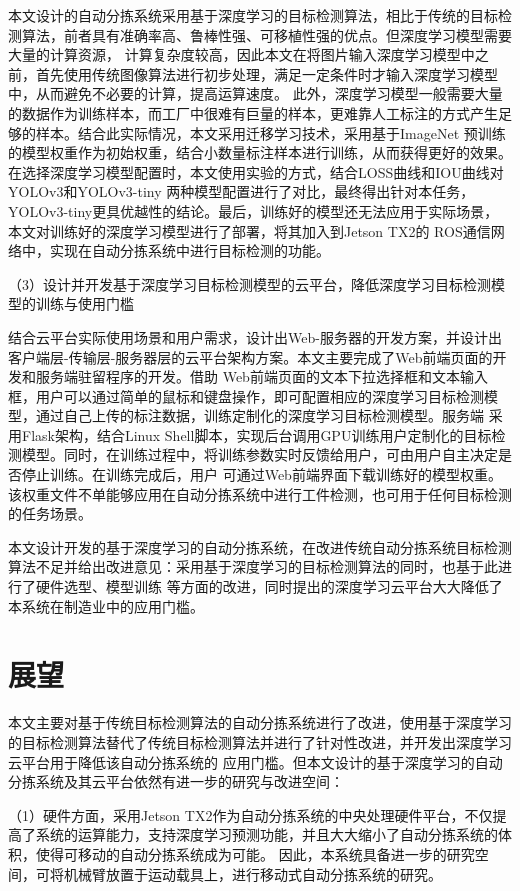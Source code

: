 本文设计的自动分拣系统采用基于深度学习的目标检测算法，相比于传统的目标检测算法，前者具有准确率高、鲁棒性强、可移植性强的优点。但深度学习模型需要大量的计算资源，
计算复杂度较高，因此本文在将图片输入深度学习模型中之前，首先使用传统图像算法进行初步处理，满足一定条件时才输入深度学习模型中，从而避免不必要的计算，提高运算速度。
此外，深度学习模型一般需要大量的数据作为训练样本，而工厂中很难有巨量的样本，更难靠人工标注的方式产生足够的样本。结合此实际情况，本文采用迁移学习技术，采用基于ImageNet
预训练的模型权重作为初始权重，结合小数量标注样本进行训练，从而获得更好的效果。在选择深度学习模型配置时，本文使用实验的方式，结合LOSS曲线和IOU曲线对YOLOv3和YOLOv3-tiny
两种模型配置进行了对比，最终得出针对本任务，YOLOv3-tiny更具优越性的结论。最后，训练好的模型还无法应用于实际场景，本文对训练好的深度学习模型进行了部署，将其加入到Jetson TX2的
ROS通信网络中，实现在自动分拣系统中进行目标检测的功能。

（3）设计并开发基于深度学习目标检测模型的云平台，降低深度学习目标检测模型的训练与使用门槛

结合云平台实际使用场景和用户需求，设计出Web-服务器的开发方案，并设计出客户端层-传输层-服务器层的云平台架构方案。本文主要完成了Web前端页面的开发和服务端驻留程序的开发。借助
Web前端页面的文本下拉选择框和文本输入框，用户可以通过简单的鼠标和键盘操作，即可配置相应的深度学习目标检测模型，通过自己上传的标注数据，训练定制化的深度学习目标检测模型。服务端
采用Flask架构，结合Linux Shell脚本，实现后台调用GPU训练用户定制化的目标检测模型。同时，在训练过程中，将训练参数实时反馈给用户，可由用户自主决定是否停止训练。在训练完成后，用户
可通过Web前端界面下载训练好的模型权重。该权重文件不单能够应用在自动分拣系统中进行工件检测，也可用于任何目标检测的任务场景。

本文设计开发的基于深度学习的自动分拣系统，在改进传统自动分拣系统目标检测算法不足并给出改进意见：采用基于深度学习的目标检测算法的同时，也基于此进行了硬件选型、模型训练
等方面的改进，同时提出的深度学习云平台大大降低了本系统在制造业中的应用门槛。


\section{展望}

本文主要对基于传统目标检测算法的自动分拣系统进行了改进，使用基于深度学习的目标检测算法替代了传统目标检测算法并进行了针对性改进，并开发出深度学习云平台用于降低该自动分拣系统的
应用门槛。但本文设计的基于深度学习的自动分拣系统及其云平台依然有进一步的研究与改进空间：

（1）硬件方面，采用Jetson TX2作为自动分拣系统的中央处理硬件平台，不仅提高了系统的运算能力，支持深度学习预测功能，并且大大缩小了自动分拣系统的体积，使得可移动的自动分拣系统成为可能。
因此，本系统具备进一步的研究空间，可将机械臂放置于运动载具上，进行移动式自动分拣系统的研究。

